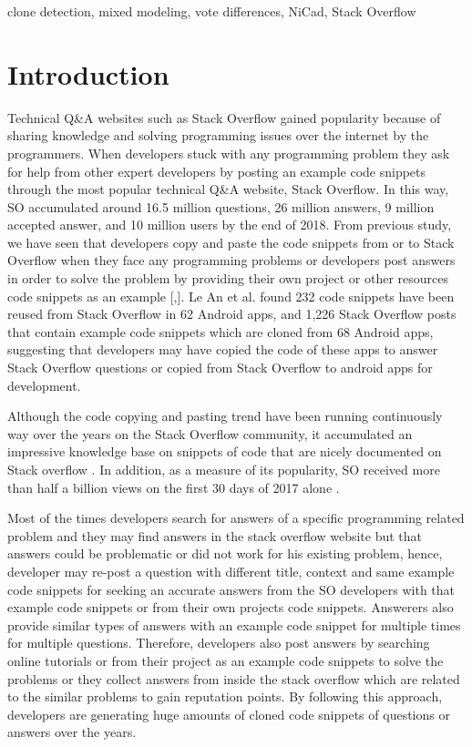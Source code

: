 \documentclass[conference]{IEEEtran}
\begin{document}
	\begin{IEEEkeywords}
		clone detection, mixed modeling, vote differences, NiCad, Stack Overflow
	\end{IEEEkeywords}
	
	\section{Introduction} \label{intro}
	Technical Q\&A websites such as Stack Overflow gained popularity because of sharing knowledge and solving programming issues over the internet by the programmers. When developers stuck with any programming problem they ask for help from other expert developers by posting an example code snippets through the most popular technical Q\&A website, Stack Overflow. In this way, SO accumulated around 16.5 million questions, 26 million answers, 9 million accepted answer, and 10 million users by the end of 2018. 
	From previous study, we have seen that developers copy and paste the code snippets from or to Stack Overflow when they face any programming problems or developers post answers in order to solve the problem by providing their own project or other resources code snippets as an example [,]. Le An et al. found 232 code snippets have been reused from Stack Overflow in 62 Android apps, and 1,226 Stack Overflow posts that contain example code snippets which are cloned from 68 Android apps, suggesting that developers may have copied the code of these apps to answer Stack Overflow questions \cite{b5} or copied from Stack Overflow to android apps for development.
	
	Although the code copying and pasting trend have been running continuously way over the years on the Stack Overflow community, it accumulated an impressive knowledge base on snippets of code that are nicely documented on Stack overflow \cite{b3}. In addition, as a measure of its popularity, SO received more than half a billion views on the first 30 days of 2017 alone \cite{b4}. 
	
	Most of the times developers search for answers of a specific programming related problem and they may find answers in the stack overflow website but that answers could be problematic or did not work for his existing problem, hence, developer may re-post a question with different title, context and same example code snippets for seeking an accurate answers from the SO developers with that example code snippets or from their own projects code snippets. Answerers also provide similar types of answers with an example code snippet for multiple times for multiple questions. Therefore, developers also post answers by searching online tutorials or from their project as an example code snippets to solve the problems or they collect answers from inside the stack overflow which are related to the similar problems to gain reputation points. By following this approach, developers are generating huge amounts of cloned code snippets of questions or answers over the years. 
	
\end{document}
